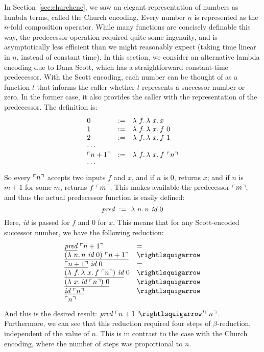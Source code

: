 In Section~\ref{sec:churchenc}, we saw an elegant representation of
numbers as lambda terms, called the Church encoding.  Every number $n$
is represented as the $n$-fold composition operator.  While many
functions are concisely definable this way, the predecessor operation
required quite some ingenuity, and is asymptotically less efficient
than we might reasonably expect (taking time linear in $n$, instead of
constant time).  In this section, we consider an alternative lambda
encoding due to Dana Scott, which has a straightforward constant-time
predecessor.  With the Scott encoding, each number can be thought of
as a function $t$ that informs the caller whether $t$ represents a
successor number or zero.  In the former case, it also provides the
caller with the representation of the predecessor. The definition is:
\[
\begin{array}{lll}
  0 & := & \lam{f}{\lam{x}{x}} \\
  1 & := & \lam{f}{\lam{x}{f\ 0}} \\
  2 & := & \lam{f}{\lam{x}{f\ 1}} \\
  \multicolumn{3}{l}{\cdots} \\
  \rep{n+1} & := & \lam{f}{\lam{x}{f\ \rep{n}}} \\
  \multicolumn{3}{l}{\cdots} 
\end{array}
\]
So every $\ulcorner n \urcorner$ accepts two inputs $f$ and $x$, and if
$n$ is $0$, returns $x$; and if $n$ is $m+1$ for some $m$, returns
$f\ \ulcorner m \urcorner$.  This makes available the predecessor $\ulcorner m \urcorner$, and
thus the actual predecessor function is easily defined:
\[
\textit{pred} \ := \ \lam{n}{n\ \textit{id}\ 0}
\]
\noindent Here, \textit{id} is passed for $f$ and $0$ for $x$.  This means
that for any Scott-encoded successor number, we have the following reduction:
\[
\begin{array}{ll}
  \underline{\textit{pred}}\ \rep{n+1} & = \\
\underline{(\lam{n}{n\ \textit{id}\ 0})\ \rep{n+1}} & \betaa \\
\underline{\rep{n+1}}\ \textit{id}\ 0 & = \\
\underline{(\lam{f}{\lam{x}{f\ \rep{n}}})\ \textit{id}}\ 0 & \betaa \\
\underline{(\lam{x}{\textit{id}\ \rep{n}})\ 0} & \betaa \\
\underline{\textit{id}\ \rep{n}} & \betaa \\
\rep{n} & \
\end{array}
\]
\noindent And this is the desired result: $\textit{pred}\ \rep{n+1}
\betaa^* \rep{n}$.  Furthermore, we can see that this reduction required
four steps of $\beta$-reduction, independent of the value of $n$.
This is in contrast to the case with the Church encoding, where the
number of steps was proportional to $n$.

